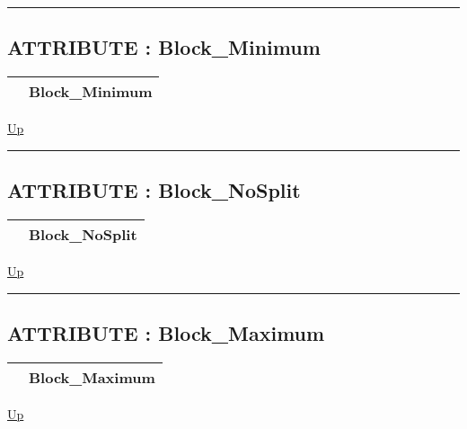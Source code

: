 \rule{\textwidth}{0.4pt}

\subsection*{ATTRIBUTE : Block\_Minimum}
\hypertarget{ecldoc:pbblas.constants.block_minimum}{}

{\renewcommand{\arraystretch}{1.5}
\begin{tabularx}{\textwidth}{|>{\raggedright\arraybackslash}l|X|}
\hline
\hspace{0pt} & Block\_Minimum \\
\hline
\end{tabularx}
}

\hyperlink{ecldoc:PBblas.Constants}{Up}

\par


\rule{\textwidth}{0.4pt}
\subsection*{ATTRIBUTE : Block\_NoSplit}
\hypertarget{ecldoc:pbblas.constants.block_nosplit}{}

{\renewcommand{\arraystretch}{1.5}
\begin{tabularx}{\textwidth}{|>{\raggedright\arraybackslash}l|X|}
\hline
\hspace{0pt} & Block\_NoSplit \\
\hline
\end{tabularx}
}

\hyperlink{ecldoc:PBblas.Constants}{Up}

\par


\rule{\textwidth}{0.4pt}
\subsection*{ATTRIBUTE : Block\_Maximum}
\hypertarget{ecldoc:pbblas.constants.block_maximum}{}

{\renewcommand{\arraystretch}{1.5}
\begin{tabularx}{\textwidth}{|>{\raggedright\arraybackslash}l|X|}
\hline
\hspace{0pt} & Block\_Maximum \\
\hline
\end{tabularx}
}

\hyperlink{ecldoc:PBblas.Constants}{Up}

\par


